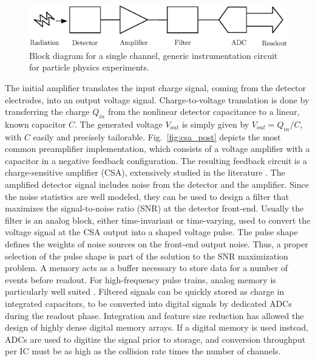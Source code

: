 \begin{figure}
	\centering
    \includegraphics[width=5in]{./Figures/detector.eps}
	\caption{Block diagram for a single channel, generic instrumentation circuit for particle physics experiments.}
	\label{fig:intint}
\end{figure}

The initial amplifier translates the input charge signal, coming from the detector electrodes, into an output voltage signal. Charge-to-voltage translation is done by transferring the charge $Q_{in}$ from the nonlinear detector capacitance to a linear, known capacitor $C$. The generated voltage $V_{out}$ is simply given by $V_{out} = Q_{in}/C$, with $C$ easily and precisely tailorable. Fig.~\ref{fig:csa_post} depicts the most common preamplifier implementation, which consists of a voltage amplifier with a capacitor in a negative feedback configuration. The resulting feedback circuit is a charge-sensitive amplifier (CSA), extensively studied in the literature \citep{Snoeys100,Asp100,deGeronimo500,oconnor100,Alvarez101}. The amplified detector signal includes noise from the detector and the amplifier. Since the noise statistics are well modeled, they can be used to design a filter that maximizes the signal-to-noise ratio (SNR) at the detector front-end. Usually the filter is an analog block, either time-invariant or time-varying, used to convert the voltage signal at the CSA output into a shaped voltage pulse. The pulse shape defines the weights of noise sources on the front-end output noise. Thus, a proper selection of the pulse shape is part of the solution to the SNR maximization problem. A memory acts as a buffer necessary to store data for a number of events before readout. For high-frequency pulse trains, analog memory is particularly well suited \citep{Kleinfelder100,Haller100}. Filtered signals can be quickly stored as charge in integrated capacitors, to be converted into digital signals by dedicated ADCs during the readout phase. Integration and feature size reduction has allowed the design of highly dense digital memory arrays. If a digital memory is used instead, ADCs are used to digitize the signal prior to storage, and conversion throughput per IC must be as high as the collision rate times the number of channels. 

